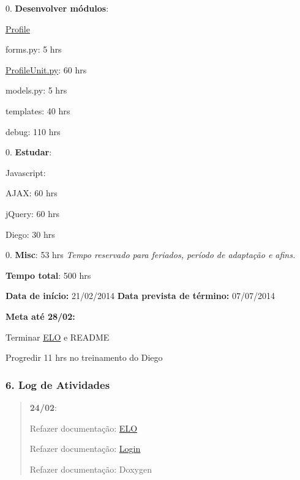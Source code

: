 0. {\bfseries Desenvolver módulos}\-:
\begin{DoxyItemize}
\item \hyperlink{namespaceProfile}{Profile}
\begin{DoxyItemize}
\item forms.\-py\-: 5 hrs
\item \hyperlink{ProfileUnit_8py}{Profile\-Unit.\-py}\-: 60 hrs
\item models.\-py\-: 5 hrs
\item templates\-: 40 hrs
\item debug\-: 110 hrs
\end{DoxyItemize}
\end{DoxyItemize}

0. {\bfseries Estudar}\-:
\begin{DoxyItemize}
\item Javascript\-:
\begin{DoxyItemize}
\item A\-J\-A\-X\-: 60 hrs
\item j\-Query\-: 60 hrs
\end{DoxyItemize}
\item Diego\-: 30 hrs
\end{DoxyItemize}

0. {\bfseries Misc}\-: 53 hrs {\itshape Tempo reservado para feriados, período de adaptação e afins.}

{\bfseries Tempo total}\-: 500 hrs

{\bfseries Data de início\-:} 21/02/2014 {\bfseries Data prevista de término\-:} 07/07/2014

{\bfseries Meta até 28/02\-:}
\begin{DoxyItemize}
\item Terminar \hyperlink{namespaceELO}{E\-L\-O} e R\-E\-A\-D\-M\-E
\item Progredir 11 hrs no treinamento do Diego
\end{DoxyItemize}

\subsubsection*{6. Log de Atividades}

\begin{quotation}
{\bfseries 24/02}\-:
\begin{DoxyItemize}
\item Refazer documentação\-: \hyperlink{namespaceELO}{E\-L\-O}
\item Refazer documentação\-: \hyperlink{namespaceLogin}{Login}
\item Refazer documentação\-: Doxygen
\end{DoxyItemize}

\end{quotation}


